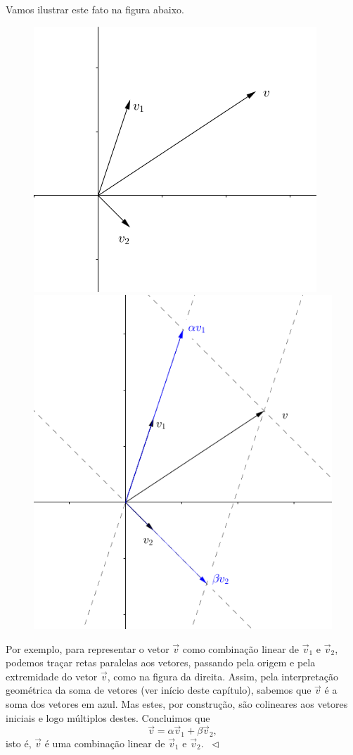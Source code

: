 \begin{ex}
	Vamos ilustrar este fato na figura abaixo.
	\begin{figure}[h!]
		\begin{center}
			\includegraphics[width=0.4\linewidth]{Semana02/semana02-comblinear1}
			\includegraphics[width=0.4\linewidth]{Semana02/semana02-comblinear3}
		\end{center}
	\end{figure}
	Por exemplo, para representar o vetor $\vec{v}$ como combinação linear de $\vec{v}_1$ e $\vec{v}_2$, podemos traçar retas paralelas aos vetores, passando pela origem e pela extremidade do vetor $\vec{v}$, como na figura da direita. Assim, pela interpretação geométrica da soma de vetores (ver início deste capítulo), sabemos que $\vec{v}$ é a soma dos vetores em azul. Mas estes, por construção, são colineares aos vetores iniciais e logo múltiplos destes. Concluimos que
	\begin{equation}
	\vec{v} = \alpha \vec{v}_1 + \beta \vec{v}_2,
	\end{equation} isto é, $\vec{v}$ é uma combinação linear de $\vec{v}_1$ e $\vec{v}_2$. $\ \lhd$
\end{ex}



